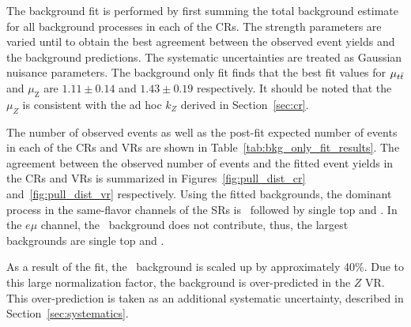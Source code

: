 The background fit is performed by first summing the total background estimate
for all background processes in each of the CRs.
The strength parameters are varied until to obtain the best agreement between
the observed event yields and the background predictions.
The systematic uncertainties are treated as Gaussian nuisance parameters.
The background only fit finds that the best fit values for $\mu_{t\bar{t}}$ and
$\mu_\mathrm{Z}$ are $1.11 \pm 0.14$ and $1.43 \pm 0.19$ respectively.
It should be noted that the $\mu_Z$ is consistent with the ad hoc $k_Z$
derived in Section~\ref{sec:cr}.

The number of observed events as well as the post-fit expected number
of events in each of the CRs and VRs are shown in
Table~\ref{tab:bkg_only_fit_results}.
The agreement between the observed number of events and the fitted event
yields in the CRs and VRs is summarized in
Figures~\ref{fig:pull_dist_cr} and~\ref{fig:pull_dist_vr} respectively.
Using the fitted backgrounds, the dominant process in the same-flavor
channels of the SRs is \ZGAMMAJETS\ followed by single top and
\TTBAR. In the $e\mu$ channel, the \ZGAMMAJETS\ background does
not contribute, thus, the largest backgrounds are single top and \TTBAR.

As a result of the fit, the \ZGAMMAJETS\ background is scaled up by
approximately 40\%. Due to this large normalization factor, the background is
over-predicted in the $Z$ VR. This over-prediction is taken as an additional
systematic uncertainty, described in Section~\ref{sec:systematics}.

